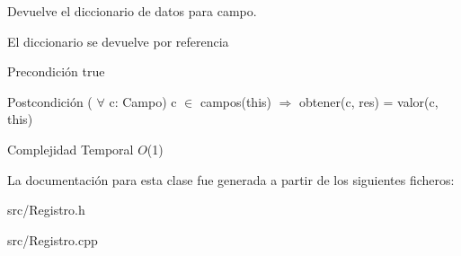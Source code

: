 Devuelve el diccionario de datos para campo. 

El diccionario se devuelve por referencia

\begin{DoxyPrecond}{Precondición}
true 
\end{DoxyPrecond}
\begin{DoxyPostcond}{Postcondición}
( $\forall$ c\-: Campo) c $\in$ campos(this) $\Rightarrow$ obtener(c, res) = valor(c, this)
\end{DoxyPostcond}

\begin{DoxyDescription}
\item[Complejidad Temporal]$O$(1)
\end{DoxyDescription}

La documentación para esta clase fue generada a partir de los siguientes ficheros\-:\begin{DoxyCompactItemize}
\item 
src/Registro.\-h\item 
src/Registro.\-cpp\end{DoxyCompactItemize}
